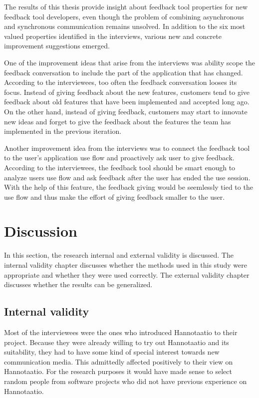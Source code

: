 \documentclass[english,12pt,a4paper,pdftex]{article}
\begin{document}
The results of this thesis provide insight about feedback tool properties for new feedback tool developers, even though the problem of combining asynchronous and synchronous communication remains unsolved. In addition to the six most valued properties identified in the interviews, various new and concrete improvement suggestions emerged.

One of the improvement ideas that arise from the interviews was ability scope the feedback conversation to include the part of the application that has changed. According to the interviewees, too often the feedback conversation looses its focus. Instead of giving feedback about the new features, customers tend to give feedback about old features that have been implemented and accepted long ago. On the other hand, instead of giving feedback, customers may start to innovate new ideas and forget to give the feedback about the features the team has implemented in the previous iteration.

Another improvement idea from the interviews was to connect the feedback tool to the user's application use flow and proactively ask user to give feedback. According to the interviewees, the feedback tool should be smart enough to analyze users use flow and ask feedback after the user has ended the use session. With the help of this feature, the feedback giving would be seemlessly tied to the use flow and thus make the effort of giving feedback smaller to the user.

\clearpage

\section{Discussion}
\label{sec:discussion}
\acresetall

In this section, the research internal and external validity is discussed. The internal validity chapter discusses whether the methods used in this study were appropriate and whether they were used correctly. The external validity chapter discusses whether the results can be generalized.

\subsection{Internal validity}

Most of the interviewees were the ones who introduced Hannotaatio to their project. Because they were already willing to try out Hannotaatio and its suitability, they had to have some kind of special interest towards new communication media. This admittedly affected positively to their view on Hannotaatio. For the research purposes it would have made sense to select random people from software projects who did not have previous experience on Hannotaatio.
\end{document}
